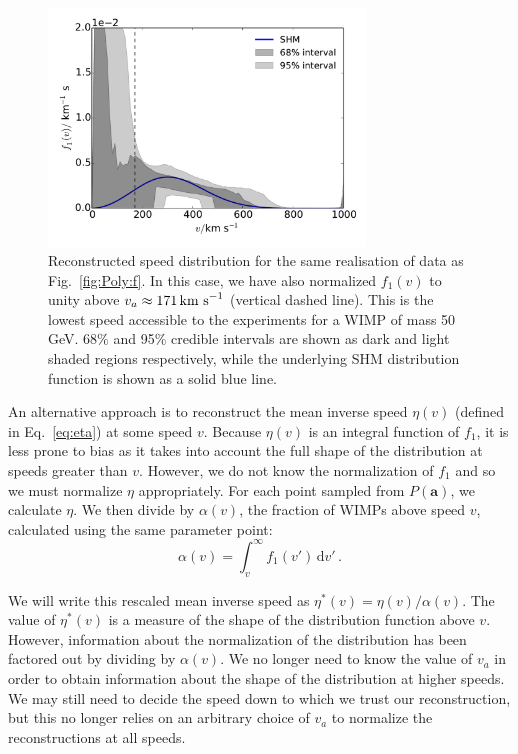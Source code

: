 \begin{figure}[t]
\centering
  \includegraphics[width=0.75\textwidth]{Poly/f_SHM_scaled_line.pdf}
  \caption[Reconstructed speed distribution for a single realisation of data using the polynomial $\ln f(v)$ parametrisation, normalised to unity above the threshold speed of the experiments]{Reconstructed speed distribution for the same realisation of data as Fig.~\ref{fig:Poly:f}. In this case, we have also normalized $f_1(v)$ to unity above $v_a \approx 171 \,\textrm{km s}^{-1}$ (vertical dashed line). This is the lowest speed accessible to the experiments for a WIMP of mass 50 GeV. 68\% and 95\% credible intervals are shown as dark and light shaded regions respectively, while the underlying SHM distribution function is shown as a solid blue line.}
  \label{fig:Poly:f_scaled}
\end{figure}

An alternative approach is to reconstruct the mean inverse speed $\eta(v)$ (defined in Eq.~\ref{eq:eta}) at some speed $v$. Because $\eta(v)$ is an integral function of $f_1$, it is less prone to bias as it takes into account the full shape of the distribution at speeds greater than $v$. However, we do not know the normalization of $f_1$ and so we must normalize $\eta$ appropriately. For each point sampled from $P(\textbf{a})$, we calculate $\eta$. We then divide by $\alpha(v)$, the fraction of WIMPs above speed $v$, calculated using the same parameter point:
\begin{equation}
\label{eq:alpha}
\alpha(v) = \int_{v}^{\infty} f_1(v') \, \textrm{d}v'\,.
\end{equation}

We will write this rescaled mean inverse speed as $\eta^*(v) = \eta(v)/\alpha(v)$. The value of $\eta^*(v)$ is a measure of the shape of the distribution function above $v$. However, information about the normalization of the distribution has been factored out by dividing by $\alpha(v)$. We no longer need to know the value of $v_a$ in order to obtain information about the shape of the distribution at higher speeds. We may still need to decide the speed down to which we trust our reconstruction, but this no longer relies on an arbitrary choice of $v_a$ to normalize the reconstructions at all speeds.

